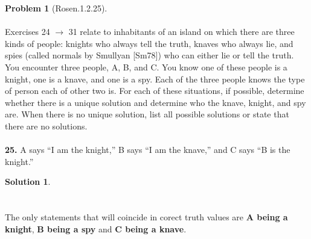 \documentclass{article}
\theoremstyle{definition}
\newtheorem*{problem}{Problem}
\newtheorem*{solution}{Solution}
\begin{document}
\begin{problem}[Rosen.1.2.25]\ \\
\ \\
Exercises 24 $\rightarrow$ 31 relate to inhabitants of an island on which
there are three kinds of people: knights who always tell the
truth, knaves who always lie, and spies (called normals by
Smullyan [Sm78]) who can either lie or tell the truth. You
encounter three people, A, B, and C. You know one of these
people is a knight, one is a knave, and one is a spy. Each of the
three people knows the type of person each of other two is. For
each of these situations, if possible, determine whether there
is a unique solution and determine who the knave, knight, and
spy are. When there is no unique solution, list all possible
solutions or state that there are no solutions.\ \\
\ \\
\textbf{25.} A says “I am the knight,” B says “I am the knave,” and
C says “B is the knight.”
\begin{compactenum}
\renewcommand{\theenumi}{\alph{enumi}}

\end{compactenum}
\end{problem}

\begin{solution}\ \\
\ \\
\ \\
\noindent
The only statements that will coincide in corect truth values are \textbf{A being a knight}, \textbf{B being a spy} and \textbf{C being a knave}.




\begin{compactenum}
\renewcommand{\theenumi}{\alph{enumi}}


\end{compactenum}
\end{solution}
\end{document}
